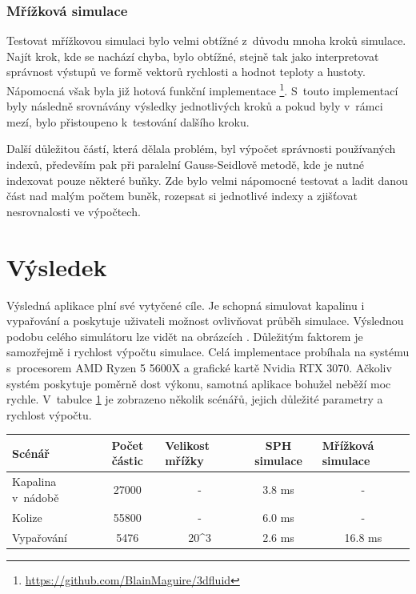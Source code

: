 \subsubsection{Mřížková simulace}
Testovat mřížkovou simulaci bylo velmi obtížné z~důvodu mnoha kroků simulace. Najít krok, kde se nachází chyba, bylo obtížné, stejně tak jako interpretovat správnost výstupů ve formě vektorů rychlosti a hodnot teploty a hustoty. Nápomocná však byla již hotová funkční implementace \footnote{\url{https://github.com/BlainMaguire/3dfluid}}. S~touto implementací byly následně srovnávány výsledky jednotlivých kroků a pokud byly v~rámci mezí, bylo přistoupeno k~testování dalšího kroku.

Další důležitou částí, která dělala problém, byl výpočet správnosti používaných indexů, především pak při paralelní Gauss-Seidlově metodě, kde je nutné indexovat pouze některé buňky. Zde bylo velmi nápomocné testovat a ladit danou část nad malým počtem buněk, rozepsat si jednotlivé indexy a zjišťovat nesrovnalosti ve výpočtech.

\section{Výsledek}
\label{chapter:vysledek}

Výsledná aplikace plní své vytyčené cíle. Je schopná simulovat kapalinu i vypařování a poskytuje uživateli možnost ovlivňovat průběh simulace. Výslednou podobu celého simulátoru lze vidět na obrázcích . Důležitým faktorem je samozřejmě i rychlost výpočtu simulace. Celá implementace probíhala na systému s~procesorem AMD Ryzen 5 5600X a grafické kartě Nvidia RTX 3070. Ačkoliv systém poskytuje poměrně dost výkonu, samotná aplikace bohužel neběží moc rychle. V~tabulce \ref{tab:times} je zobrazeno několik scénářů, jejich důležité parametry a rychlost výpočtu.

\begin{table}[h]
\begin{tabular}{l|c|c|c|c}
Scénář            & Počet částic & \multicolumn{1}{l|}{Velikost mřížky} & SPH simulace & \multicolumn{1}{l}{Mřížková simulace} \\ \hline
Kapalina v~nádobě & 27000        & -                                    & 3.8 ms       & -                                     \\
Kolize            & 55800        & -                                    & 6.0 ms       & -                                     \\
Vypařování        & 5476         & 20^3                                   & 2.6 ms       & 16.8 ms                              
\end{tabular}
\label{tab:times}
\end{table}

